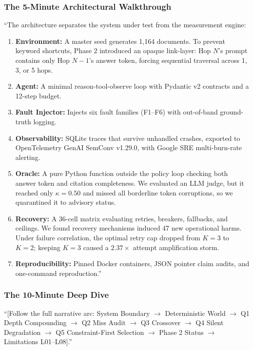 \subsubsection{The 5-Minute Architectural Walkthrough}
``The architecture separates the system under test from the measurement engine:
\begin{enumerate}
    \item \textbf{Environment:} A master seed generates 1,164 documents. To prevent keyword shortcuts, Phase 2 introduced an opaque link-layer: Hop $N$'s prompt contains only Hop $N-1$'s answer token, forcing sequential traversal across 1, 3, or 5 hops.
    \item \textbf{Agent:} A minimal reason-tool-observe loop with Pydantic v2  contracts and a 12-step budget.
    \item \textbf{Fault Injector:} Injects six fault families (F1--F6) with out-of-band ground-truth logging.
    \item \textbf{Observability:} SQLite traces that survive unhandled crashes, exported to OpenTelemetry GenAI SemConv v1.29.0, with Google SRE multi-burn-rate alerting.
    \item \textbf{Oracle:} A pure Python function outside the policy loop checking both answer token and citation completeness. We evaluated an LLM judge, but it reached only $\kappa=0.50$ and missed all borderline token corruptions, so we quarantined it to advisory status.
    \item \textbf{Recovery:} A 36-cell matrix evaluating retries, breakers, fallbacks, and ceilings. We found recovery mechanisms induced 47 new operational harms. Under failure correlation, the optimal retry cap dropped from $K=3$ to $K=2$; keeping $K=3$ caused a $2.37\times$ attempt amplification storm.
    \item \textbf{Reproducibility:} Pinned Docker containers, JSON pointer claim audits, and one-command reproduction.''
\end{enumerate}

\subsubsection{The 10-Minute Deep Dive}
``[Follow the full narrative arc: System Boundary $\to$ Deterministic World $\to$ Q1 Depth Compounding $\to$ Q2 Miss Audit $\to$ Q3 Crossover $\to$ Q4 Silent Degradation $\to$ Q5 Constraint-First Selection $\to$ Phase 2 Status $\to$ Limitations L01--L08].''

\vspace{12pt}
